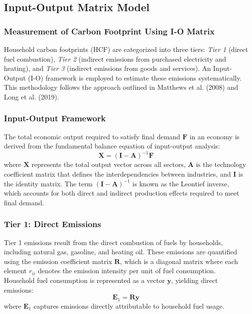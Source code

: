 \documentclass[12pt,a4paper]{article}
\begin{document}
\subsection{Input-Output Matrix Model}

\subsubsection*{Measurement of Carbon Footprint Using I-O Matrix}

Household carbon footprints (HCF) are categorized into three tiers: \textit{Tier 1} (direct fuel combustion), \textit{Tier 2} (indirect emissions from purchased electricity and heating), and \textit{Tier 3} (indirect emissions from goods and services). An Input-Output (I-O) framework is employed to estimate these emissions systematically. This methodology follows the approach outlined in Matthews et al. (2008) and Long et al. (2019).

\subsubsection*{Input-Output Framework}
The total economic output required to satisfy final demand \( \mathbf{F} \) in an economy is derived from the fundamental balance equation of input-output analysis:
\begin{equation}
    \mathbf{X} = (\mathbf{I} - \mathbf{A})^{-1} \mathbf{F}
\end{equation}
where \( \mathbf{X} \) represents the total output vector across all sectors, \( \mathbf{A} \) is the technology coefficient matrix that defines the interdependencies between industries, and \( \mathbf{I} \) is the identity matrix. The term \( (\mathbf{I} - \mathbf{A})^{-1} \) is known as the Leontief inverse, which accounts for both direct and indirect production effects required to meet final demand.

\subsubsection*{Tier 1: Direct Emissions}
Tier 1 emissions result from the direct combustion of fuels by households, including natural gas, gasoline, and heating oil. These emissions are quantified using the emission coefficient matrix \( \mathbf{R} \), which is a diagonal matrix where each element \( r_{ii} \) denotes the emission intensity per unit of fuel consumption. Household fuel consumption is represented as a vector \( \mathbf{y} \), yielding direct emissions:
\begin{equation}
    \mathbf{E}_1 = \mathbf{R} \mathbf{y}
\end{equation}
where \( \mathbf{E}_1 \) captures emissions directly attributable to household fuel usage.
\end{document}
